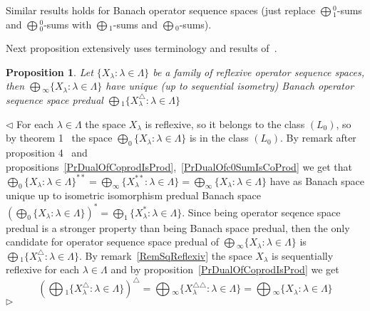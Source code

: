 \documentclass[12pt]{article}
\newtheorem{proposition}[theorem]{Proposition}
\newenvironment{proof}{\par $\triangleleft$}{$\triangleright$}
\begin{document}
Similar results holds for Banach operator sequence spaces 
(just replace $\bigoplus{}_1^0$-sums and $\bigoplus{}_0^0$-sums 
with $\bigoplus{}_1$-sums and $\bigoplus{}_0$-sums).

Next proposition extensively uses terminology and 
results of~\cite{BrownItoUniquePredual}.

\begin{proposition}\label{PrUniquePredualForCoproduct}
Let $ \{X_\lambda:\lambda\in\Lambda \}$ be a family of reflexive operator 
sequence spaces, then $\bigoplus{}_\infty \{X_\lambda:\lambda\in\Lambda \}$ 
have unique (up to sequential isometry) Banach operator sequence space 
predual $\bigoplus{}_1 \{X_\lambda^\triangle:\lambda\in\Lambda \}$
\end{proposition} 
\begin{proof} For each $\lambda\in\Lambda$ the space $X_\lambda$ is reflexive, 
so it belongs to the class $(L_0)$, so by 
theorem 1~\cite{BrownItoUniquePredual} 
the space $\bigoplus_0 \{X_\lambda:\lambda\in\Lambda \}$ 
is in the class $(L_0)$. 
By remark after proposition 4~\cite{BrownItoUniquePredual} 
and propositions~\ref{PrDualOfCoprodIsProd},~\ref{PrDualOfc0SumIsCoProd} 
we get that 
$\bigoplus_0 {\{X_\lambda:\lambda\in\Lambda \}}^{**}
=\bigoplus_\infty \{X_\lambda^{**}:\lambda\in\Lambda \}
=\bigoplus_\infty \{X_\lambda:\lambda\in\Lambda \}$ 
have as Banach space unique up to isometric isomorphism predual Banach space 
${(\bigoplus_0 \{X_\lambda:\lambda\in\Lambda \})}^{*}
=\bigoplus_1 \{X_\lambda^{*}:\lambda\in\Lambda \}$. 
Since being operator seqence space predual is a stronger property than being 
Banach space predual, then the only candidate for operator 
sequence space predual of $\bigoplus{}_\infty \{X_\lambda:\lambda\in\Lambda \}$ 
is $\bigoplus{}_1 \{X_\lambda^\triangle:\lambda\in\Lambda \}$. 
By remark~\ref{RemSqReflexiv} the space $X_\lambda$ is sequentially reflexive 
for each $\lambda\in\Lambda$ and by proposition~\ref{PrDualOfCoprodIsProd} 
we get
$$
{\left(\bigoplus{}_1 \{
    X_\lambda^\triangle:\lambda\in\Lambda 
\}\right)}^\triangle
=\bigoplus{}_\infty \{X_\lambda^{\triangle\triangle}:\lambda\in\Lambda \}
=\bigoplus{}_\infty \{X_\lambda:\lambda\in\Lambda \}
$$
\end{proof}
\end{document}
